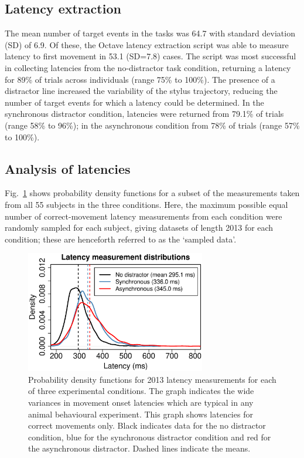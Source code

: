 \documentclass[10pt,letterpaper]{article}
\begin{document}
\subsection*{Latency extraction}

The mean number of target events in the tasks was 64.7 with standard
deviation (SD) of 6.9. Of these, the Octave latency extraction script
was able to measure latency to first movement in 53.1 (SD=7.8)
cases. The script was most successful in collecting latencies from the
no-distractor task condition, returning a latency for 89\% of trials
across individuals (range 75\% to 100\%). The presence of a distractor
line increased the variability of the stylus trajectory, reducing the
number of target events for which a latency could be determined. In
the synchronous distractor condition, latencies were returned from
79.1\% of trials (range 58\% to 96\%); in the asynchronous condition
from 78\% of trials (range 57\% to 100\%).

\subsection*{Analysis of latencies}

Fig.~\ref{data_density} shows probability density functions for a
subset of the measurements taken from all 55 subjects in the three
conditions. Here, the maximum possible equal number of
correct-movement latency measurements from each condition were
randomly sampled for each subject, giving datasets of length 2013 for
each condition; these are henceforth referred to as the `sampled
data'.

\begin{figure}[htb!]
\centering
\includegraphics[width=0.7\textwidth]{./figures/data_density.eps}
\caption[Latency measurement PDF] {Probability density functions for
  2013 latency measurements for each of three experimental
  conditions. The graph indicates the wide variances in movement onset
  latencies which are typical in any animal behavioural
  experiment. This graph shows latencies for correct movements
  only. Black indicates data for the no distractor condition, blue for
  the synchronous distractor condition and red for the asynchronous
  distractor. Dashed lines indicate the means.}
\label{data_density}
\end{figure}
\end{document}

